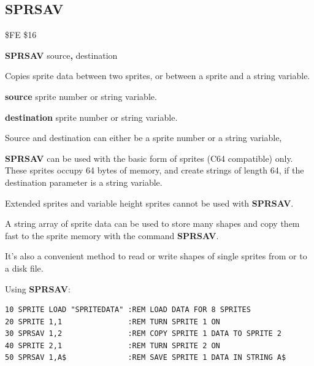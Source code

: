 
\newpage
\subsection{SPRSAV}
\begin{description}[leftmargin=2cm,style=nextline]
\item [Token:] \$FE \$16
\item [Format:] {\bf SPRSAV} source{\bf,} destination
\item [Usage:]  Copies sprite data between two sprites, or between a sprite and a string variable.

                {\bf source} sprite number or string variable.

                {\bf destination} sprite number or string variable.

\item [Remarks:] Source and destination can either be
                a sprite number or a string variable,

                {\bf SPRSAV} can be used with the basic form of sprites
                (C64 compatible) only. These sprites occupy 64 bytes of memory,
                and create strings of length 64, if the destination
                parameter is a string variable.

                Extended sprites and variable height sprites
                cannot be used with {\bf SPRSAV}.

                A string array of sprite data can be used to store
                many shapes and copy them fast to the sprite memory
                with the command {\bf SPRSAV}.

                It's also a convenient method to read or write
                shapes of single sprites from or to a disk file.

\item [Example:] Using {\bf SPRSAV}:
\begin{tcolorbox}[colback=black,coltext=white]
\verbatimfont{\codefont}
\begin{verbatim}
10 SPRITE LOAD "SPRITEDATA" :REM LOAD DATA FOR 8 SPRITES
20 SPRITE 1,1               :REM TURN SPRITE 1 ON
30 SPRSAV 1,2               :REM COPY SPRITE 1 DATA TO SPRITE 2
40 SPRITE 2,1               :REM TURN SPRITE 2 ON
50 SPRSAV 1,A$              :REM SAVE SPRITE 1 DATA IN STRING A$
\end{verbatim}
\end{tcolorbox}
\end{description}

